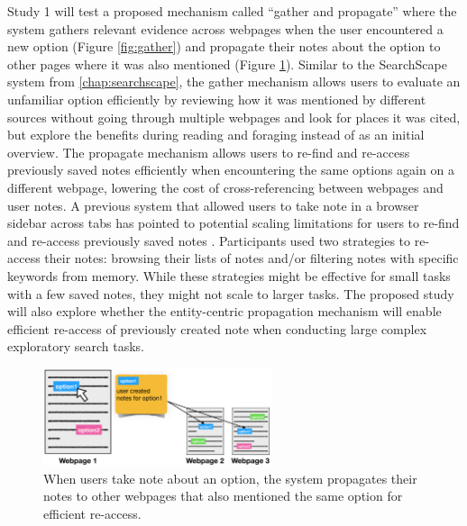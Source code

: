 Study 1 will test a proposed mechanism called ``gather and propagate'' where the system gathers relevant evidence across webpages when the user encountered a new option (Figure \ref{fig:gather}) and propagate their notes about the option to other pages where it was also mentioned (Figure \ref{fig:propagate}).
Similar to the SearchScape system from \cref{chap:searchscape}, the gather mechanism allows users to evaluate an unfamiliar option efficiently by reviewing how it was mentioned by different sources without going through multiple webpages and look for places it was cited, but explore the benefits during reading and foraging instead of as an initial overview. The propagate mechanism allows users to re-find and re-access previously saved notes efficiently when encountering the same options again on a different webpage, lowering the cost of cross-referencing between webpages and user notes. 
A previous system that allowed users to take note in a browser sidebar across tabs has pointed to potential scaling limitations for users to re-find and re-access previously saved notes \cite{notetoself}. Participants used two strategies to re-access their notes: browsing their lists of notes and/or filtering notes with specific keywords from memory. While these strategies might be effective for small tasks with a few saved notes, they might not scale to larger tasks. The proposed study will also explore whether the entity-centric propagation mechanism will enable efficient re-access of previously created note when conducting large complex exploratory search tasks.

\begin{figure}
    \centering
    \includegraphics[width=0.6\textwidth]{images/propagate.png}
    \caption{When users take note about an option, the system propagates their notes to other webpages that also mentioned the same option for efficient re-access.}
    \label{fig:propagate}
\end{figure}
